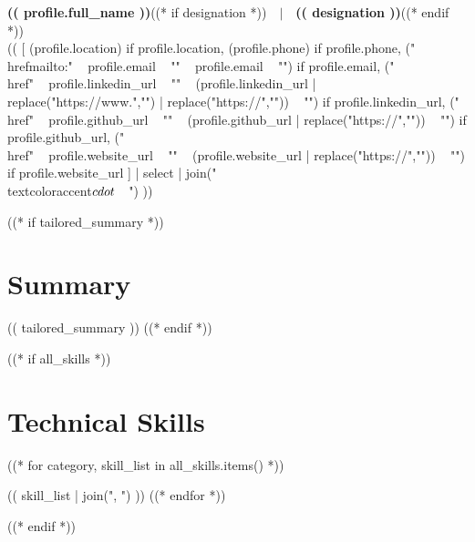 \documentclass[11pt,a4paper]{article}
\begin{document}
\begin{center}
{\LARGE \textbf{\color{primary} (( profile.full_name ))}}((* if designation *))~~{\small \textcolor{accent}{$|$~~\textbf{(( designation ))}}}((* endif *))\\[3pt]
\scriptsize
(( [
  (profile.location)                                                                                         if profile.location,
  (profile.phone)                                                                                            if profile.phone,
  ("\\href{mailto:" ~ profile.email ~ "}{" ~ profile.email ~ "}")                                           if profile.email,
  ("\\href{" ~ profile.linkedin_url ~ "}{" ~ (profile.linkedin_url | replace("https://www.","") | replace("https://","")) ~ "}") if profile.linkedin_url,
  ("\\href{" ~ profile.github_url ~ "}{" ~ (profile.github_url | replace("https://","")) ~ "}")             if profile.github_url,
  ("\\href{" ~ profile.website_url ~ "}{" ~ (profile.website_url | replace("https://","")) ~ "}")           if profile.website_url
] | select | join("~~\\textcolor{accent}{$\\cdot$}~~") ))
\end{center}

\vspace{-2pt}

((* if tailored_summary *))
\section*{Summary}
{\small (( tailored_summary ))}
((* endif *))

((* if all_skills *))
\section*{Technical Skills}
\begin{description}[font=\bfseries\small, style=multiline, leftmargin=6em, itemsep=0pt]
((* for category, skill_list in all_skills.items() *))
    \item[(( category ))] {\small (( skill_list | join(", ") ))}
((* endfor *))
\end{description}
((* endif *))
\end{document}
